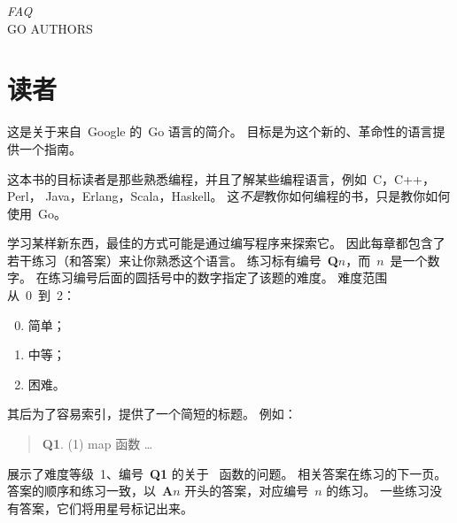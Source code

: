 {\textit{FAQ}\\ \textsc{GO AUTHORS}}

\section{读者}
\noindent{}这是关于来自~Google 的~Go 语言的简介。
目标是为这个新的、革命性的语言提供一个指南。

这本书的目标读者是那些熟悉编程，并且了解某些编程语言，例如~C\cite{c}，C++\cite{c++}，\\ 
Perl\cite{perl}， Java\cite{java}，Erlang\cite{erlang}，Scala\cite{scala}，Haskell\cite{haskell}。
这\emph{不是}教你如何编程的书，只是教你如何使用~Go。

学习某样新东西，最佳的方式可能是通过编写程序来探索它。
因此每章都包含了若干练习（和答案）来让你熟悉这个语言。
练习标有编号~\textbf{Q$n$}，而~$n$~是一个数字。 
在练习编号后面的圆括号中的数字指定了该题的难度。
难度范围从~0~到~2：
\begin{enumerate}
\setcounter{enumi}{-1}
\item 简单；
\item 中等；
\item 困难。
\end{enumerate}

其后为了容易索引，提供了一个简短的标题。
例如：
\begin{verse}
\textbf{Q1}. (1) map 函数 \ldots
\end{verse}
展示了难度等级~1、编号~\textbf{Q1} 的关于~ 函数的问题。
相关答案在练习的下一页。
答案的顺序和练习一致，以~\textbf{A$n$} 开头的答案，对应编号~$n$ 的练习。
一些练习没有答案，它们将用星号标记出来。

